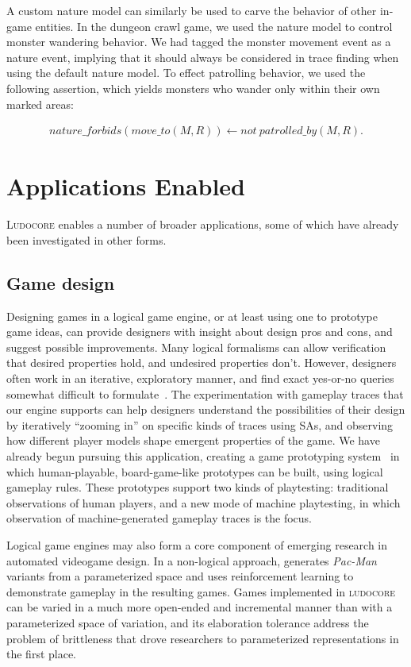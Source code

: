 \documentclass[letterpaper]{article}
\newcommand{\ludocore}{\textsc{ludocore}}
\newcommand{\Ludocore}{\textsc{Ludocore}}
\newcommand{\snippet}[1]{{\vspace{-0.4cm}\footnotesize\begin{align*}#1\end{align*}\vspace{-0.4cm}}}
\begin{document}
A custom nature model can similarly be used to carve the behavior of other in-game
entities. In the dungeon crawl game, we used the nature model to control
monster wandering behavior. We had tagged the monster movement event as a
nature event, implying that it should always be considered in trace finding
when using the default nature model. To effect patrolling behavior, we used the
following assertion, which yields monsters who wander only within their own
marked areas:

\snippet{nature\_forbids(move\_to(M,R)) \leftarrow not\ patrolled\_by(M,R).}

\section{Applications Enabled}

\Ludocore{} enables a number of broader applications, some of which have
already been investigated in other forms.

\subsection{Game design}

Designing games in a logical game engine, or at least using one to prototype
game ideas, can provide designers with insight about design pros and cons, and
suggest possible improvements. Many logical formalisms can allow verification
that desired properties hold, and undesired properties don't. However,
designers often work in an iterative, exploratory manner, and find exact
yes-or-no queries somewhat difficult to formulate~\citep{FDG09}.
The experimentation with gameplay traces that our engine supports can help
designers understand the possibilities of their design by iteratively ``zooming
in'' on specific kinds of traces using SAs, and observing how different player
models shape emergent properties of the game. We have already begun pursuing
this application, creating a game prototyping system~\citep{AIIDE09} in which
human-playable, board-game-like prototypes can be built, using logical gameplay
rules. These prototypes support two kinds of playtesting: traditional
observations of human players, and a new mode of machine playtesting, in which
observation of machine-generated gameplay traces is the focus.

Logical game engines may also form a core component of emerging research in
automated videogame design. In a non-logical approach, \citet{Togelius:Experiment}
generates \emph{Pac-Man} variants from a parameterized space and uses reinforcement
learning to demonstrate gameplay in the resulting games. Games implemented in
\ludocore{} can be varied in a much more open-ended and incremental manner than
with a parameterized space of variation, and its elaboration tolerance address
the problem of brittleness that drove researchers to parameterized
representations in the first place.
\end{document}
